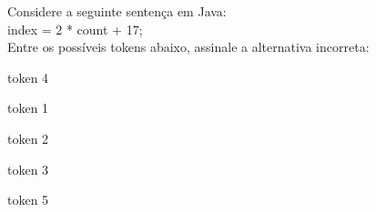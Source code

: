 \question[10]

Considere a seguinte sentença em Java:\\
index = 2 * count + 17;\\
Entre os possíveis tokens abaixo, assinale a alternativa incorreta:\\
\begin{choices}
\item token 4
\item token 1 
\item token 2
\item token 3 
\item token 5 %
\end{choices}
\answerline

